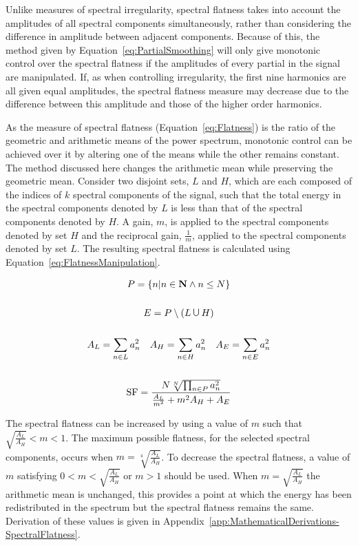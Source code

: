 		Unlike measures of spectral irregularity, spectral flatness takes into account the amplitudes of all
		spectral components simultaneously, rather than considering the difference in amplitude between adjacent
		components. Because of this, the method given by Equation~\ref{eq:PartialSmoothing} will only give
		monotonic control over the spectral flatness if the amplitudes of every partial in the signal are
		manipulated. If, as when controlling irregularity, the first nine harmonics are all given equal amplitudes,
		the spectral flatness measure may decrease due to the difference between this amplitude and those of the
		higher order harmonics.

		As the measure of spectral flatness (Equation~\ref{eq:Flatness}) is the ratio of the geometric and
		arithmetic means of the power spectrum, monotonic control can be achieved over it by altering one of the
		means while the other remains constant. The method discussed here changes the arithmetic mean while
		preserving the geometric mean. Consider two disjoint sets, $L$ and $H$, which are each composed of the
		indices of $k$ spectral components of the signal, such that the total energy in the spectral components
		denoted by $L$ is less than that of the spectral components denoted by $H$. A gain, $m$, is applied to the
		spectral components denoted by set $H$ and the reciprocal gain, $\frac{1}{m}$, applied to the spectral
		components denoted by set $L$. The resulting spectral flatness is calculated using
		Equation~\ref{eq:FlatnessManipulation}.

		\begin{gather}
			P = \left\{ n | n \in \textbf{N} \land n \leq N \right\} \nonumber \\
			\nonumber \\
			E = P \setminus (L \medcup H) \nonumber \\
			\nonumber \\
			A_{L} = \sum_{n \in L} a_{n}^{2} \quad A_{H} = \sum_{n \in H} a_{n}^{2}
			   \quad A_{E} = \sum_{n \in E} a_{n}^{2} \nonumber \\
			\nonumber \\
			\mathrm{SF} = \frac{N\sqrt[N]{\prod_{n \in P} a_{n}^{2}}}
					   {\frac{A_{L}}{m^{2}} + m^{2}A_{H} + A_{E}}
			\label{eq:FlatnessManipulation}
		\end{gather}

		The spectral flatness can be increased by using a value of $m$ such that $\sqrt{\frac{A_{L}}{A_{H}}} < m <
		1$. The maximum possible flatness, for the selected spectral components, occurs when $m =
		\sqrt[4]{\frac{A_{L}}{A_{H}}}$. To decrease the spectral flatness, a value of $m$ satisfying $0 < m <
		\sqrt{\frac{A_{L}}{A_{H}}}$ or $m > 1$ should be used. When $m = \sqrt{\frac{A_{L}}{A_{H}}}$ the arithmetic
		mean is unchanged, this provides a point at which the energy has been redistributed in the spectrum but the
		spectral flatness remains the same. Derivation of these values is given in
		Appendix~\ref{app:MathematicalDerivations-SpectralFlatness}.

